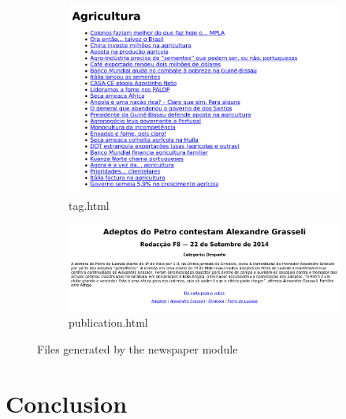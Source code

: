 \documentclass[a4paper]{article}
\begin{document}
\begin{figure}[H]
\begin{subfigure}{0.45\textwidth}
    \end{subfigure}
    \begin{subfigure}{0.45\textwidth}
        \includegraphics[width=\textwidth]{./tag_print.png}
        \caption{tag.html}
    \end{subfigure}
    \begin{subfigure}{0.54\textwidth}
        \includegraphics[width=\textwidth]{./publication_print.png}
        \caption{publication.html}
    \end{subfigure}
    \caption{Files generated by the newspaper module}
\end{figure}

\section{Conclusion}
\end{document}
